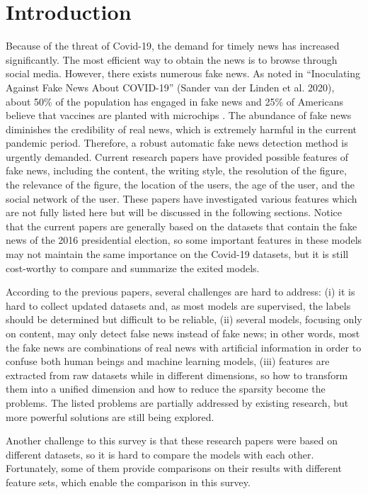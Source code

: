 \documentclass[sigconf ,nonacm]{acmart}
\begin{document}
\section{Introduction}
Because of the threat of Covid-19, the demand for timely news has increased significantly. The most efficient way to obtain the news is to browse through social media. However, there exists numerous fake news. As noted in ``Inoculating Against Fake News About COVID-19'' (Sander van der Linden et al. 2020), about 50\% of the population has engaged in fake news and 25\% of Americans believe that vaccines are planted with microchips \cite{covid-fake}. The abundance of fake news diminishes the credibility of real news, which is extremely harmful in the current pandemic period. Therefore, a robust automatic fake news detection method is urgently demanded. Current research papers have provided possible features of fake news, including the content, the writing style, the resolution of the figure, the relevance of the figure, the location of the users, the age of the user, and the social network of the user.  These papers have investigated various features which are not fully listed here but will be discussed in the following sections. Notice that the current papers are generally based on the datasets that contain the fake news of the 2016 presidential election, so some important features in these models may not maintain the same importance on the Covid-19 datasets, but it is still cost-worthy to compare and summarize the exited models.

According to the previous papers, several challenges are hard to address: (i) it is hard to collect updated datasets and, as most models are supervised, the labels should be determined but difficult to be reliable, (ii) several models, focusing only on content, may only detect false news instead of fake news; in other words, most the fake news are combinations of real news with artificial information in order to confuse both human beings and machine learning models, (iii) features are extracted from raw datasets while in different dimensions, so how to transform them into a unified dimension and how to reduce the sparsity become the problems. The listed problems are partially addressed by existing research, but more powerful solutions are still being explored. 

Another challenge to this survey is that these research papers were based on different datasets, so it is hard to compare the models with each other. Fortunately, some of them provide comparisons on their results with different feature sets, which enable the comparison in this survey.
\end{document}
